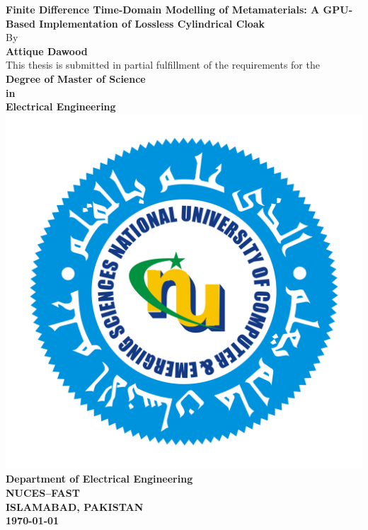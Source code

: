 
\begin{titlepage}
\begin{center}

{\Large \bfseries Finite Difference Time-Domain Modelling of Metamaterials: A GPU-Based Implementation of Lossless Cylindrical Cloak}\\[0.5cm]

{\large By}\\[0.5cm]
{\large \bfseries Attique Dawood}\\[1cm]

{\large This thesis is submitted in partial fulfillment of the requirements for the}\\[1cm]
{\large \bfseries Degree of Master of Science\\[0.2cm] in\\[0.2cm] Electrical Engineering}\\[2cm]

\includegraphics[scale=0.15]{NU_Logo.png}\\[2cm]

{\large \bfseries Department of Electrical Engineering}\\[0.2cm]
{\large \bfseries NUCES--FAST}\\[0.2cm]
{\large \bfseries ISLAMABAD, PAKISTAN}\\[0.2cm]
{\large \bfseries \today}

\end{center}
\end{titlepage}